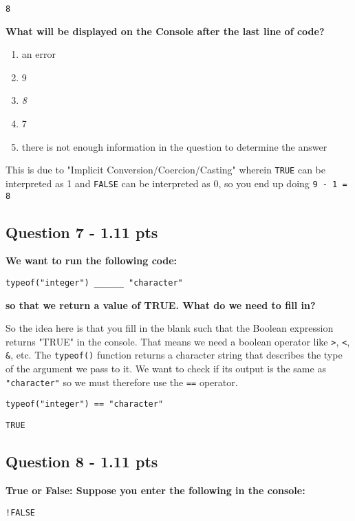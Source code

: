 \documentclass[11pt]{article}
\begin{document}
\begin{verbatim}
8
\end{verbatim}


\textbf{What will be displayed on the Console after the last line of code?}

\begin{enumerate}
\item an error
\item 9
\item \emph{8}
\item 7
\item there is not enough information in the question to determine the answer
\end{enumerate}


This is due to "Implicit Conversion/Coercion/Casting" wherein \texttt{TRUE} can be interpreted as 1 and \texttt{FALSE} can be interpreted as 0, so you end up doing \texttt{9 - 1 = 8}
\subsection*{Question 7 - 1.11 pts}
\label{sec:orgc558c68}
\textbf{We want to run the following code:}

\texttt{typeof("integer") \_\_\_\_\_\_  "character"}

\textbf{so that we return a value of TRUE. What do we need to fill in?}

So the idea here is that you fill in the blank such that the Boolean expression returns "TRUE" in the console.  That means we need a boolean operator like \texttt{>}, \texttt{<}, \texttt{\&}, etc.  The \texttt{typeof()} function returns a character string that describes the type of the argument we pass to it.  We want to check if its output is the same as \texttt{"character"} so we must therefore use the \texttt{==} operator.

\begin{verbatim}
typeof("integer") == "character"
\end{verbatim}

\begin{verbatim}
TRUE
\end{verbatim}
\subsection*{Question 8 - 1.11 pts}
\label{sec:orgb9bfe36}
\textbf{True or False: Suppose you enter the following in the console:}

\texttt{!FALSE}
\end{document}
